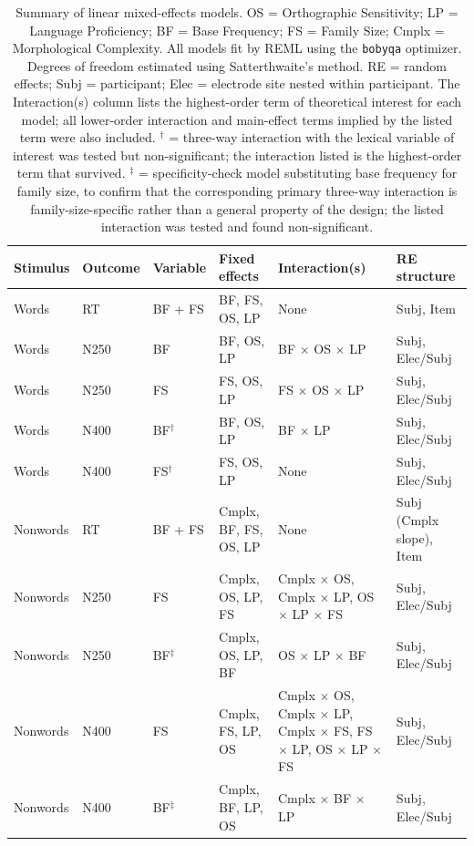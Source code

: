 \documentclass[utf8]{FrontiersinHarvard} %
\begin{document}
	\begin{table}[h!]
		\centering
		\small
		\renewcommand{\arraystretch}{1.4}
		\caption{Summary of linear mixed-effects models. OS = Orthographic Sensitivity; LP = Language Proficiency; BF = Base Frequency; FS = Family Size; Cmplx = Morphological Complexity. All models fit by REML using the \texttt{bobyqa} optimizer. Degrees of freedom estimated using Satterthwaite's method. RE = random effects; Subj = participant; Elec = electrode site nested within participant. The Interaction(s) column lists the highest-order term of theoretical interest for each model; all lower-order interaction and main-effect terms implied by the listed term were also included. $^\dagger$ = three-way interaction with the lexical variable of interest was tested but non-significant; the interaction listed is the highest-order term that survived. $^\ddagger$ = specificity-check model substituting base frequency for family size, to confirm that the corresponding primary three-way interaction is family-size-specific rather than a general property of the design; the listed interaction was tested and found non-significant.}
		\label{tab:models}
		\begin{tabular}{p{1.6cm} p{1.2cm} p{1.3cm} p{3.8cm} p{3.2cm} p{2.5cm}}
			\toprule
			\textbf{Stimulus} & \textbf{Outcome} & \textbf{Variable} & 
			\textbf{Fixed effects} & \textbf{Interaction(s)} & 
			\textbf{RE structure} \\
			\midrule
			Words & RT & BF + FS & BF, FS, OS, LP & None & Subj, Item \\
			Words & N250 & BF & BF, OS, LP & BF $\times$ OS $\times$ LP & Subj, Elec/Subj \\
			Words & N250 & FS & FS, OS, LP & FS $\times$ OS $\times$ LP & Subj, Elec/Subj \\
			Words & N400 & BF$^\dagger$ & BF, OS, LP & BF $\times$ LP & Subj, Elec/Subj \\
			Words & N400 & FS$^\dagger$ & FS, OS, LP & None & Subj, Elec/Subj \\
			Nonwords & RT & BF + FS & Cmplx, BF, FS, OS, LP & None & Subj (Cmplx slope), Item \\
			Nonwords & N250 & FS & Cmplx, OS, LP, FS & Cmplx $\times$ OS, Cmplx $\times$ LP, OS $\times$ LP $\times$ FS & Subj, Elec/Subj \\
			Nonwords & N250 & BF$^\ddagger$ & Cmplx, OS, LP, BF & OS $\times$ LP $\times$ BF & Subj, Elec/Subj \\
			Nonwords & N400 & FS & Cmplx, FS, LP, OS & Cmplx $\times$ OS, Cmplx $\times$ LP, Cmplx $\times$ FS, FS $\times$ LP, OS $\times$ LP $\times$ FS & Subj, Elec/Subj \\
			Nonwords & N400 & BF$^\ddagger$ & Cmplx, BF, LP, OS & Cmplx $\times$ BF $\times$ LP & Subj, Elec/Subj \\
			\bottomrule
		\end{tabular}
	\end{table}
	
\end{document}
